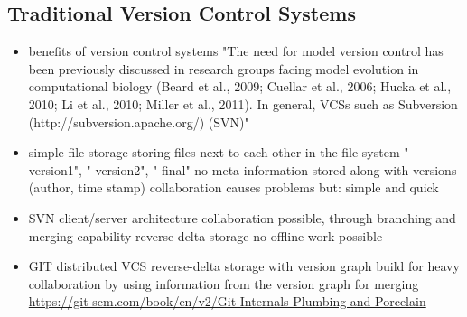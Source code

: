 	\subsection{Traditional Version Control Systems}
	\begin{itemize}
		\item benefits of version control systems
			\subitem {}
			\subitem "The need for model version control has been previously discussed in research groups facing model evolution in computational biology (Beard et al., 2009; Cuellar et al., 2006; Hucka et al., 2010; Li et al., 2010; Miller et al., 2011). In general, VCSs such as Subversion (http://subversion.apache.org/) (SVN)" \cite{Waltemath2013}
		\item simple file storage
			\subitem storing files next to each other in the file system
			\subitem "-version1", "-version2", "-final"
			\subitem no meta information stored along with versions (author, time stamp)
			\subitem collaboration causes problems
			\subitem but: simple and quick
		\item SVN
			\subitem client/server architecture
			\subitem collaboration possible, through branching and merging capability
			\subitem reverse-delta storage
			\subitem no offline work possible
		\item GIT
			\subitem distributed VCS
			\subitem reverse-delta storage with version graph
			\subitem build for heavy collaboration by using information from the version graph for merging
			\subitem {}
			\subitem \url{https://git-scm.com/book/en/v2/Git-Internals-Plumbing-and-Porcelain}
	\end{itemize}
		

